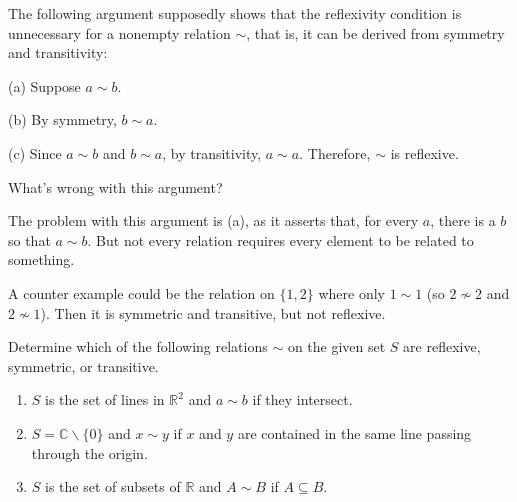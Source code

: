 \documentclass[11pt,dvipsnames]{book}
\numberwithin{equation}{section} %
\numberwithin{figure}{section} %
\numberwithin{table}{section} %
\begin{document}
\begin{exercise}
 The following argument supposedly shows that the reflexivity condition is unnecessary for a nonempty relation $\sim$, that is, it can be derived from symmetry and transitivity:

(a) Suppose $a\sim b$.

(b) By symmetry, $b\sim a$. 

(c) Since $a\sim b$ and $b\sim a$, by transitivity, $a\sim a$. Therefore, $\sim $  is reflexive. 

What's wrong with this argument? 

\begin{solution}
The problem with this argument is (a), as it asserts that, for every $a$, there is a $b$ so that $a\sim b$. But not every relation requires every element to be related to something. 

A counter example could be the relation on $\{1,2\}$ where only $1\sim 1$ (so $2\not\sim 2$ and $2\not\sim 1$). Then it is symmetric and transitive, but not reflexive. 
\end{solution}
\end{exercise}



\begin{exercise}
Determine which of the following relations $\sim$ on the given set $S$ are reflexive, symmetric, or transitive.
\begin{enumerate}
\item $S$ is the set of lines in $\mathbb{R}^{2}$ and $a\sim b$ if they intersect.
\item $S=\mathbb{C}\backslash \{0\}$ and $x\sim y$ if $x$ and $y$ are contained in the same line passing through the origin.
\item $S$ is the set of subsets of $\mathbb{R}$ and $A\sim B$ if $A\subseteq B$.  

\end{enumerate}

\end{exercise}
\end{document}
